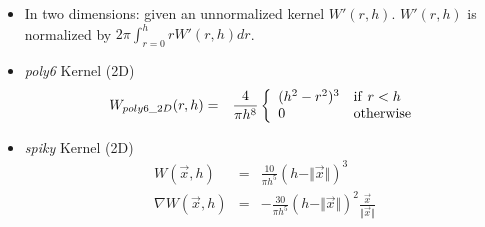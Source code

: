 \documentclass[8pt]{article}
\begin{document}
\section*{}
\begin{itemize}
    \item In two dimensions: given an unnormalized kernel $W'(r, h)$. $W'(r, h)$ is normalized by $2\pi\int_{r=0}^h r W'(r, h) dr$.
    \item \emph{poly6} Kernel (2D)
        \begin{eqnarray}
        W_{poly6\_2D}(r, h) &=& \frac{4}{\pi h^8}\left\{\begin{array}{ll} (h^2 - r^2)^3 & {\rm if\ } r < h \\ 0 & {\rm otherwise}\end{array}\right.
        \end{eqnarray}
    \item \emph{spiky} Kernel (2D)
        \begin{eqnarray}
            W(\vec{x}, h) &=& \frac{10}{\pi h^5}(h - \Vert\vec{x}\Vert)^3 \\
            \nabla W(\vec{x}, h) &=& -\frac{30}{\pi h^5}(h - \Vert\vec{x}\Vert)^2\frac{\vec{x}}{\Vert\vec{x}\Vert}
        \end{eqnarray}
\end{itemize}
\end{document}
